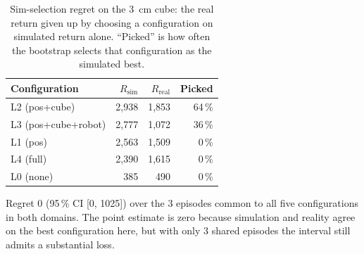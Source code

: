 \begin{table}[h]
\centering
\caption{Sim-selection regret on the 3~cm cube: the real return given up by choosing a configuration on simulated return alone. \enquote{Picked} is how often the bootstrap selects that configuration as the simulated best.}
\label{tab:regret}
\begin{tabular}{lrrr}
\hline
\textbf{Configuration} & \textbf{$R_{\mathrm{sim}}$} & \textbf{$R_{\mathrm{real}}$} & \textbf{Picked} \\
\hline
L2 (pos+cube) & 2,938 & 1,853 & 64\,\% \\
L3 (pos+cube+robot) & 2,777 & 1,072 & 36\,\% \\
L1 (pos) & 2,563 & 1,509 & 0\,\% \\
L4 (full) & 2,390 & 1,615 & 0\,\% \\
L0 (none) & 385 & 490 & 0\,\% \\
\hline
\end{tabular}

\vspace{2pt}
\begin{minipage}{0.95\linewidth}
\footnotesize Regret 0 (95\,\% CI [0, 1025]) over the 3 episodes common to all five configurations in both domains. The point estimate is zero because simulation and reality agree on the best configuration here, but with only 3 shared episodes the interval still admits a substantial loss.
\end{minipage}
\end{table}
